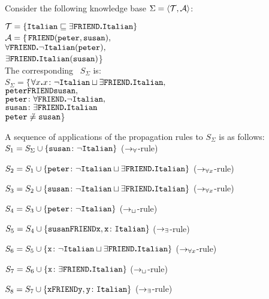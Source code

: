 \begin{example}%
Consider the following knowledge base $\Sigma = \langle{\cal T},{\cal A} \rangle$:
\def\i{{\tt Italian}}
\begin{tabbing}
\indent$\T = \{\inclc {\i} {\SOME {\tt FRIEND}{\i}}\}$\\[0.8ex]
\indent${\cal A} = \{$\=$ {\tt FRIEND(peter,susan),}$\+\\
               $\ALL {{\tt FRIEND}} {\NOT \i}({\tt peter}), $\\
	       $\SOME {{\tt FRIEND}} {\i} ({\tt susan})$\}\-\\[1.3ex]

The corresponding \cs\ $S_{\Sigma}$ is:\\[1.3ex]

\indent$S_{\Sigma} = \{$\=$\univinc x {\NOT \i\OR\SOME {\tt FRIEND}{\i}},$\+\\
		     	$\tt peter\tt FRIEND\tt susan,$\\
			$\inc {\tt peter} {\ALL {\tt FRIEND} {\NOT \i}},$\\
  			$\inc {\tt susan} {\SOME {\tt FRIEND} {\i}}$\\
			${\tt peter}\not\doteq{\tt susan}$\} \-
\end{tabbing}

\noindent
A sequence of applications of the propagation rules to $S_{\Sigma}$
is as follows:\\[1.3ex]
\indent
$S_1  =  S_{\Sigma} \cup \set{\inc {\tt susan} {\NOT \i}}$
              ($\rightarrow_\forall$-rule)

$S_2  =  S_1 \cup \set{\inc {\tt peter} {\NOT \i\OR\SOME {FRIEND}{\i}}}$
                                  ($\rightarrow_{\forall x}$-rule)

$S_3  =  S_2 \cup \set{\inc {\tt susan} {\NOT \i\OR\SOME {FRIEND}{\i}}}$
                                  ($\rightarrow_{\forall x}$-rule)

$S_4  =  S_3 \cup \set{\inc {\tt peter} {\NOT \i}}$
                                  ($\rightarrow_\sqcup$-rule)

$S_5  =  S_4 \cup \set{ \relc {\tt susan} {\tt FRIEND} {\tt x},\inc {\tt x} {\i}}$
                                  ($\rightarrow_\exists$-rule)

$S_6  =  S_5 \cup \set{\inc {\tt x} {\NOT \i\OR\SOME {FRIEND}{\i}}}$
                                  ($\rightarrow_{\forall x}$-rule)

$S_7  =  S_6 \cup \set{\inc {\tt x} {\SOME {FRIEND}{\i}}}$
                                  ($\rightarrow_\sqcup$-rule)

$S_8  =  S_7 \cup \set{ \relc {\tt x} {\tt FRIEND} {\tt y},\inc {\tt y} {\i}}$
                                  ($\rightarrow_\exists$-rule)


\end{example}
